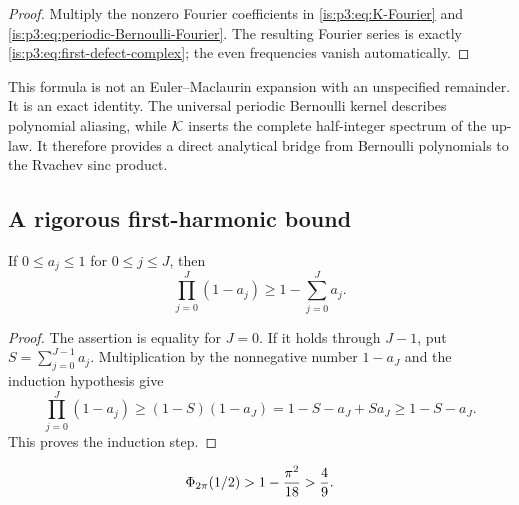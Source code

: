 \begin{proof}
Multiply the nonzero Fourier coefficients in \eqref{is:p3:eq:K-Fourier} and \eqref{is:p3:eq:periodic-Bernoulli-Fourier}.  The resulting Fourier series is exactly \eqref{is:p3:eq:first-defect-complex}; the even frequencies vanish automatically.
\end{proof}

\begin{remark}
This formula is not an Euler--Maclaurin expansion with an unspecified remainder.  It is an exact identity.  The universal periodic Bernoulli kernel describes polynomial aliasing, while $\mathcal K$ inserts the complete half-integer spectrum of the up-law.  It therefore provides a direct analytical bridge from Bernoulli polynomials to the Rvachev sinc product.
\end{remark}

\subsection{A rigorous first-harmonic bound}

\begin{lemma}
\label{is:p3:lem:finite-product-loss}
If $0\le a_j\le1$ for $0\le j\le J$, then
\begin{equation}
 \prod_{j=0}^{J}(1-a_j)\ge1-\sum_{j=0}^{J}a_j.
 \label{is:p3:eq:finite-product-loss}
\end{equation}
\end{lemma}

\begin{proof}
The assertion is equality for $J=0$.  If it holds through $J-1$, put
$S=\sum_{j=0}^{J-1}a_j$.  Multiplication by the nonnegative number
$1-a_J$ and the induction hypothesis give
\[
 \prod_{j=0}^{J}(1-a_j)
 \ge(1-S)(1-a_J)
 =1-S-a_J+Sa_J
 \ge1-S-a_J.
\]
This proves the induction step.
\end{proof}

\begin{lemma}
\label{is:p3:lem:phi-half-lower}
\begin{equation}
 \Phi_{2\pi}(1/2)>1-\frac{\pi^2}{18}>\frac49.
 \label{is:p3:eq:phi-half-lower}
\end{equation}
\end{lemma}

